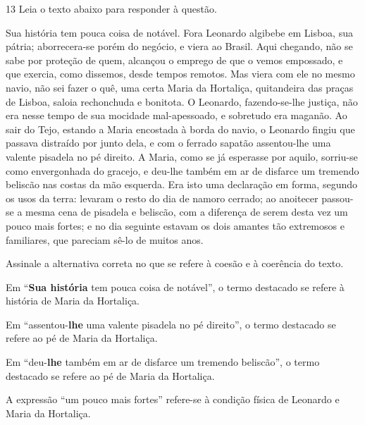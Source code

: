 \pagebreak

\num{13} Leia o texto abaixo para responder à questão. 

\begin{myquote}

Sua história tem pouca coisa de notável. Fora Leonardo
algibebe em Lisboa, sua pátria; aborrecera-se porém do negócio,
e viera ao Brasil. Aqui chegando, não se sabe por proteção de
quem, alcançou o emprego de que o vemos empossado, e que
exercia, como dissemos, desde tempos remotos. Mas viera com
ele no mesmo navio, não sei fazer o quê, uma certa Maria da
Hortaliça, quitandeira das praças de Lisboa, saloia rechonchuda e
bonitota. O Leonardo, fazendo-se-lhe justiça, não era nesse tempo
de sua mocidade mal-apessoado, e sobretudo era maganão. Ao
sair do Tejo, estando a Maria encostada à borda do navio, o
Leonardo fingiu que passava distraído por junto dela, e com o
ferrado sapatão assentou-lhe uma valente pisadela no pé direito.
A Maria, como se já esperasse por aquilo, sorriu-se como
envergonhada do gracejo, e deu-lhe também em ar de disfarce um
tremendo beliscão nas costas da mão esquerda. Era isto uma
declaração em forma, segundo os usos da terra: levaram o resto
do dia de namoro cerrado; ao anoitecer passou-se a mesma cena
de pisadela e beliscão, com a diferença de serem desta vez um
pouco mais fortes; e no dia seguinte estavam os dois amantes tão
extremosos e familiares, que pareciam sê-lo de muitos anos.


\end{myquote}

Assinale a alternativa correta no que se refere à coesão e à coerência 
do texto. 

\begin{escolha}

\item
  Em ``\textbf{Sua história} tem pouca coisa de notável'', o termo destacado
  se refere à história de Maria da Hortaliça.
\item
  Em ``assentou-\textbf{lhe} uma valente pisadela no pé direito'', o termo destacado
  se refere ao pé de Maria da Hortaliça.
\item
  Em ``deu-\textbf{lhe} também em ar de disfarce um tremendo beliscão'', o termo 
  destacado se refere ao pé de Maria da Hortaliça.
\item
  A expressão ``um pouco mais fortes'' refere-se à condição física de Leonardo e 
  Maria da Hortaliça.

\end{escolha}

